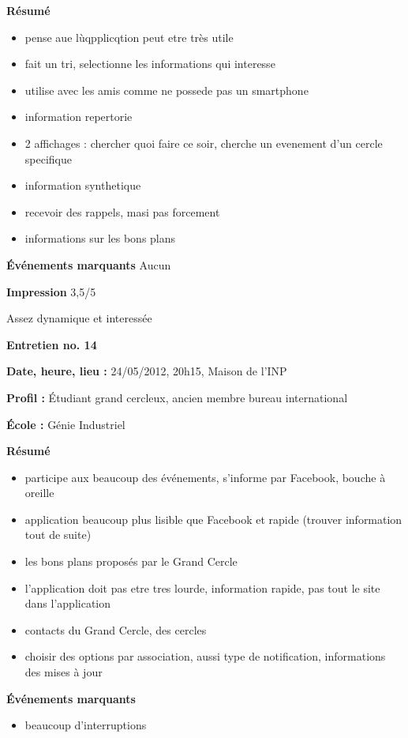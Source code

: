 \documentclass[a4paper, 11px]{article}
\begin{document}
\textbf{Résumé}
	\begin{itemize}
		\item pense aue lùqpplicqtion peut etre très utile
		\item fait un tri, selectionne les informations qui interesse
		\item utilise avec les amis comme ne possede pas un smartphone
		\item information repertorie
		\item 2 affichages : chercher quoi faire ce soir, cherche un evenement d'un cercle specifique
		\item information synthetique
		\item recevoir des rappels, masi pas forcement
		\item informations sur les bons plans
	\end{itemize}

\textbf{Événements marquants}
Aucun

\textbf{Impression}
3,5/5

Assez dynamique et interessée




\vspace{.3cm}

 \textbf {\large Entretien no. 14}

\textbf{Date, heure, lieu : }
24/05/2012, 20h15, Maison de l'INP

\textbf{Profil : }
Étudiant grand cercleux, ancien membre bureau international

\textbf{École : }
Génie Industriel

\textbf{Résumé}
	\begin{itemize}
		\item participe aux beaucoup des événements, s'informe par Facebook, bouche à oreille
		\item application beaucoup plus lisible que Facebook et rapide (trouver information tout de suite)
		\item les bons plans proposés par le Grand Cercle
		\item l'application doit pas etre tres lourde, information rapide, pas tout le site dans l'application
		\item contacts du Grand Cercle, des cercles
		\item choisir des options par association, aussi type de notification, informations des mises à jour
	\end{itemize}

\textbf{Événements marquants}
	\begin{itemize}
		\item beaucoup d'interruptions
	\end{itemize}
\end{document}
